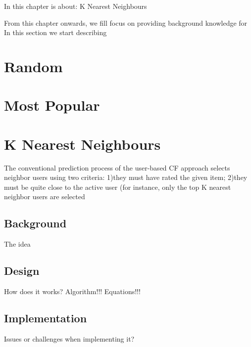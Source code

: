 In this chapter is about: K Nearest Neighbours

From this chapter onwards, we fill focus on providing background knowledge for In this section we start describing 

\section{Random}

\section{Most Popular}


\section{K Nearest Neighbours}
The conventional prediction process of the user-based CF
approach selects neighbor users using two criteria: 1)they
must have rated the given item; 2)they must be quite close
to the active user (for instance, only the top K nearest neighbor users are selected

\subsection{Background}
The idea

\subsection{Design}
How does it works?
Algorithm!!!
Equations!!!

\subsection{Implementation}
Issues or challenges when implementing it?